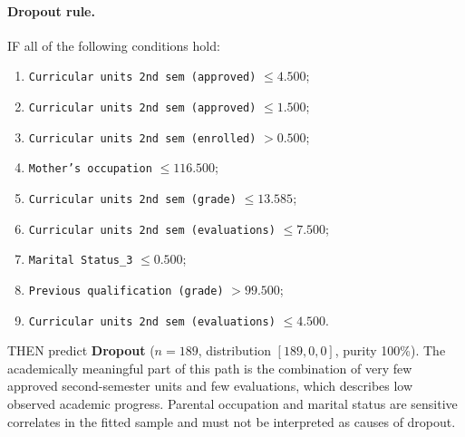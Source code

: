 \paragraph{Dropout rule.}
IF all of the following conditions hold:
\begin{enumerate}
  \small
  \setlength{\itemsep}{0.1em}
  \item \texttt{Curricular units 2nd sem (approved)} $\leq 4.500$;
  \item \texttt{Curricular units 2nd sem (approved)} $\leq 1.500$;
  \item \texttt{Curricular units 2nd sem (enrolled)} $> 0.500$;
  \item \texttt{Mother's occupation} $\leq 116.500$;
  \item \texttt{Curricular units 2nd sem (grade)} $\leq 13.585$;
  \item \texttt{Curricular units 2nd sem (evaluations)} $\leq 7.500$;
  \item \texttt{Marital Status\_3} $\leq 0.500$;
  \item \texttt{Previous qualification (grade)} $> 99.500$;
  \item \texttt{Curricular units 2nd sem (evaluations)} $\leq 4.500$.
\end{enumerate}
THEN predict \textbf{Dropout} ($n=189$, distribution $[189,0,0]$, purity
100\%). The academically meaningful part of this path is the combination of
very few approved second-semester units and few evaluations, which describes
low observed academic progress. Parental occupation and marital status are
sensitive correlates in the fitted sample and must not be interpreted as causes
of dropout.

